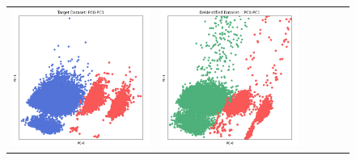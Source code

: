 \begin{figure}[p!]
\begin{tabular}{@{} M{0.166\textwidth} M{0.166\textwidth} | M{0.166\textwidth} M{0.166\textwidth} | M{0.166\textwidth} M{0.166\textwidth} @{}}
       \includegraphics[width=\linewidth]{z_mwem-pgm.orig.png} &
       \includegraphics[width=\linewidth]{z_mwem-pgm.syn.png} &

\end{tabular}
\end{figure}
